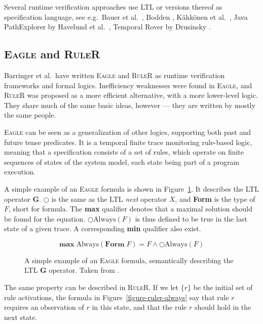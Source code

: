 \documentclass[a4paper,11pt]{kth-mag}
\theoremstyle{definition}
\begin{document}
Several runtime verification approaches use LTL or versions thereof as
specification language, see e.g.\ Bauer et al.\
\cite{bauer06monitoring}, Bodden \cite{bodden05efficientrv}, Kähkönen et al.\
\cite{kahkonen09lime}, Java PathExplorer by Havelund et al.\
\cite{havelund04jpax}, Temporal Rover by Drusinsky
\cite{drusinsky00temporalrover}.

\subsection{\textsc{Eagle} and \textsc{RuleR}}

Barringer et al.\ have written \textsc{Eagle} \cite{barringer03eagle} and
\textsc{RuleR} \cite{barringer07ruler} as runtime verification frameworks and
formal logics.  Inefficiency weaknesses were found in \textsc{Eagle}, and
\textsc{RuleR} was proposed as a more efficient alternative, with a more
lower-level logic. They share much of the same basic ideas, however --- they
are written by mostly the same people.

\textsc{Eagle} can be seen as a generalization of other logics, supporting both
past and future tense predicates. It is a temporal finite trace monitoring
rule-based logic, meaning that a specification consists of a set of rules,
which operate on finite sequences of states of the system model, each state
being part of a program execution.

A simple example of an \textsc{Eagle} formula is shown in
Figure~\ref{figure-eagle-always}.
It describes the LTL operator $\boldsymbol{G}$. $\bigcirc$ is the same as the
LTL \textit{next} operator $X$, and \textbf{Form} is the type of $F$, short for
formula. The \textbf{max} qualifier denotes that a maximal solution should be
found for the equation. $\bigcirc \text{Always}(F)$ is thus defined to be true
in the last state of a given trace. A corresponding \textbf{min} qualifier also
exist.

\begin{figure}[h!]
	\[
  \textbf{max} \; \text{Always}(\textbf{Form} \; F) = F \wedge \bigcirc \text{Always}(F)
	\]

  \caption{A simple example of an \textsc{Eagle} formula, semantically
    describing the LTL $\boldsymbol{G}$ operator. Taken from
    \cite{barringer03eagle}.}
	\label{figure-eagle-always}
\end{figure}

The same property can be described in \textsc{RuleR}. If we let $\{r\}$ be the
initial set of rule activations, the formula in
Figure~\ref{figure-ruler-always} say that rule $r$ requires an observation of
$r$ in this state, and that the rule $r$ should hold in the next state.
\end{document}
